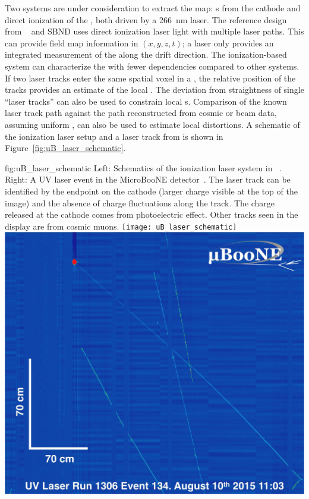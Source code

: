 Two systems are under consideration to extract the \efield map: \phel{}s from the \lartpc cathode and direct ionization of the , both driven by a \SI{266}{\nano\m} laser.  The reference design from ~\cite{bib:uBlaser2019} and SBND uses direct ionization laser light with multiple laser paths. This can provide field map information in $(x, y, z, t)$; a \phel laser only provides an integrated measurement of the \efield along the drift direction.
The ionization-based system can characterize the \efield with fewer dependencies compared to other systems. If two laser tracks enter the same spatial voxel in a , the relative position of the tracks provides an estimate of the local \threed \efield. The deviation from straightness of single ``laser tracks'' can also be used to constrain local \efield{}s. Comparison of the known laser track path against the path reconstructed from cosmic or beam data, assuming uniform \efield, can also be used to estimate local \efield distortions. A schematic of the ionization laser setup and a laser track from  is shown in Figure~\ref{fig:uB_laser_schematic}.


\begin{dunefigure}{fig:uB_laser_schematic}
{Left: Schematics of the ionization laser system in ~\cite{Antonello:2015lea}. Right: A UV laser event in the MicroBooNE detector~\cite{bib:uBlaser2019}. The laser track can be identified by the endpoint on the cathode (larger charge visible at the top of the image) and the absence of charge fluctuations along the track. The charge released at the cathode comes from photoelectric effect. Other tracks seen in the display are from cosmic muons.}
\texttt{[image: uB\_laser\_schematic]}
\includegraphics[width=0.45\linewidth]{graphics/run1306_ev134-2.jpg}
\end{dunefigure}

